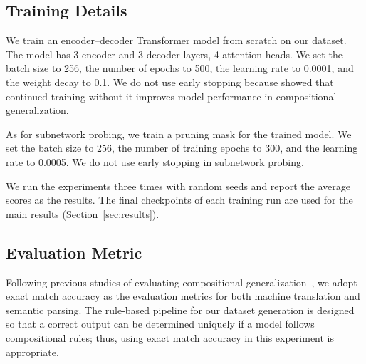 \subsection{Training Details}
We train an encoder--decoder Transformer model from scratch on our dataset.
The model has 3 encoder and 3 decoder layers, 4 attention heads.
We set the batch size to 256, the number of epochs to 500, the learning rate to 0.0001, and the weight decay to 0.1.
We do not use early stopping because \citet{csordas-etal-2021-devil} showed that continued training without it improves model performance in compositional generalization.

As for subnetwork probing, we train a pruning mask for the trained model.
We set the batch size to 256, the number of training epochs to 300, and the learning rate to 0.0005.
We do not use early stopping in subnetwork probing.

We run the experiments three times with random seeds and report the average scores as the results.
The final checkpoints of each training run are used for the main results (Section~\ref{sec:results}).

\subsection{Evaluation Metric}
\label{subsec:metric}
Following previous studies of evaluating compositional generalization~\citep{kim-linzen-2020-cogs, kumon-etal-2024-evaluating}, we adopt exact match accuracy as the evaluation metrics for both machine translation and semantic parsing.
The rule-based pipeline for our dataset generation is designed so that a correct output can be determined uniquely if a model follows compositional rules; thus, using exact match accuracy in this experiment is appropriate.
